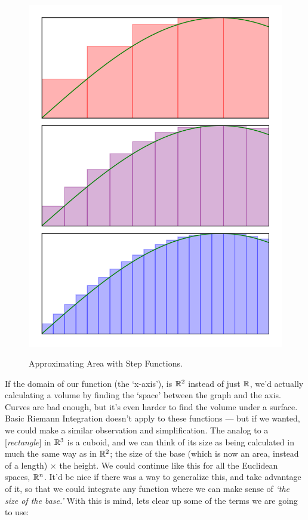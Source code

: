\begin{figure}[H]
{		\includegraphics{Code/Area4.png}}
	\caption{Approximating Area with Step Functions.}
	\label{fig:areaapprox}
\end{figure}

If the domain of our function (the `x-axis'), is $\mathbb{R}^2$ instead of just $\mathbb{R}$, we'd actually calculating a volume by finding the `space' between the graph and the axis. Curves are bad enough, but it's even harder to find the volume under a surface. Basic Riemann Integration doesn't apply to these functions --- but if we wanted, we could make a similar observation and simplification. The analog to a [\emph{rectangle}] in $\mathbb{R}^3$ is a cuboid, and we can think of its size as being calculated in much the same way as in $\mathbb{R}^2$; the size of the base (which is now an area, instead of a length) $\times$ the height. We could continue like this for all the Euclidean spaces, $\mathbb{R}^n$. It'd be nice if there was a way to generalize this, and take advantage of it, so that we could integrate any function where we can make sense of \emph{`the size of the base.'} With this is mind, lets clear up some of the terms we are going to use:

